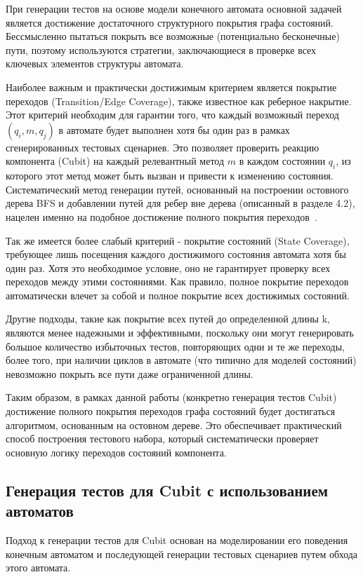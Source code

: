 \documentclass[14pt, russian]{scrartcl}
\begin{document}
При генерации тестов на основе модели конечного автомата основной задачей является достижение достаточного структурного покрытия графа состояний. Бессмысленно пытаться покрыть все возможные (потенциально бесконечные) пути, поэтому используются стратегии, заключающиеся в проверке всех ключевых элементов структуры автомата.

Наиболее важным и практически достижимым критерием является покрытие переходов (Transition/Edge Coverage), также известное как реберное накрытие. Этот критерий необходим для гарантии того, что каждый возможный переход $(q_i, m, q_j)$ в автомате будет выполнен хотя бы один раз в рамках сгенерированных тестовых сценариев. Это позволяет проверить реакцию компонента (Cubit) на каждый релевантный метод $m$ в каждом состоянии $q_i$, из которого этот метод может быть вызван и привести к изменению состояния. Систематический метод генерации путей, основанный на построении остовного дерева BFS и добавлении путей для ребер вне дерева (описанный в разделе 4.2), нацелен именно на подобное достижение полного покрытия переходов~\cite{Karhumaki1992}.

Так же имеется более слабый критерий - покрытие состояний (State Coverage), требующее лишь посещения каждого достижимого состояния автомата хотя бы один раз. Хотя это необходимое условие, оно не гарантирует проверку всех переходов между этими состояниями. Как правило, полное покрытие переходов автоматически влечет за собой и полное покрытие всех достижимых состояний.

Другие подходы, такие как покрытие всех путей до определенной длины k, являются менее надежными и эффективными, поскольку они могут генерировать большое количество избыточных тестов, повторяющих одни и те же переходы, более того, при наличии циклов в автомате (что типично для моделей состояний) невозможно покрыть все пути даже ограниченной длины.

Таким образом, в рамках данной работы (конкретно генерация тестов Cubit) достижение полного покрытия переходов графа состояний будет достигаться алгоритмом, основанным на остовном дереве. Это обеспечивает практический способ построения тестового набора, который систематически проверяет основную логику переходов состояний компонента.


\subsection{Генерация тестов для Cubit с использованием автоматов}

Подход к генерации тестов для Cubit основан на моделировании его поведения конечным автоматом и последующей генерации тестовых сценариев путем обхода этого автомата.
\end{document}
